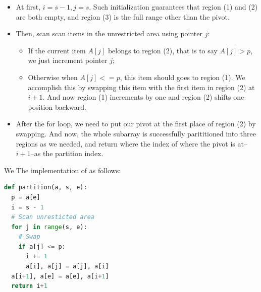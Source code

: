 \documentclass[../main.tex]{subfiles}
\begin{document}
\begin{itemize}
    \item At first, $i=s-1, j = s$. Such initialization guarantees that region (1) and (2) are both empty, and region (3) is the full range other than the pivot. \item Then, scan scan items in the unrestricted area using pointer $j$:
    \begin{itemize}
        \item If the current item $A[j]$ belongs to region (2), that is to say $A[j] >  p$,  we just increment pointer $j$; 
        \item Otherwise when $A[j] <= p$, this item should goes to region (1). We accomplish this by swapping this item with the first item in region (2) at $i+1$. And now region (1) increments by one and region (2) shifts one position backward.  
    \end{itemize}
    \item After the for loop, we need to put our pivot at the first place of region (2) by swapping. And now, the whole subarray is successfully parititioned into three regions as we needed, and return where the index of where the pivot is at--$i+1$--as the partition index. 
\end{itemize}
We The implementation of as follows:
\begin{lstlisting}[language = Python]
def partition(a, s, e):
  p = a[e]
  i = s - 1
  # Scan unresticted area
  for j in range(s, e): 
    # Swap 
    if a[j] <= p:
      i += 1
      a[i], a[j] = a[j], a[i] 
  a[i+1], a[e] = a[e], a[i+1]
  return i+1
\end{lstlisting}

\end{document}
